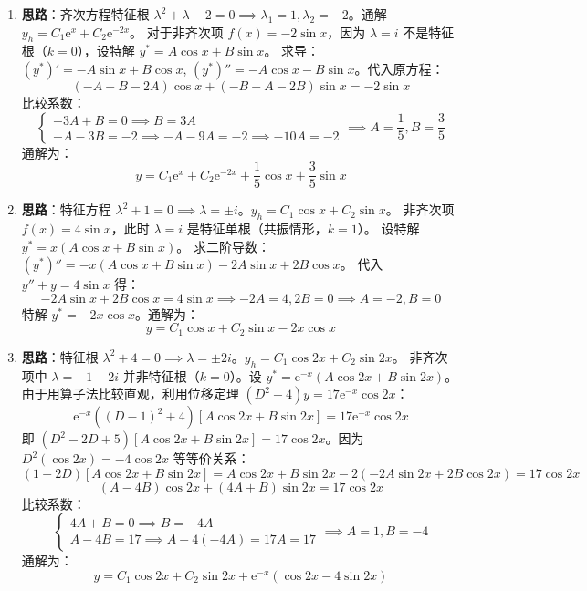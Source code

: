\documentclass[lang=cn,11pt]{elegantbook}
\begin{document}
\begin{solution}
\begin{enumerate}
    \item[(1)] \textbf{思路}：齐次方程特征根 $\lambda^2+\lambda-2=0 \implies \lambda_1=1, \lambda_2=-2$。通解 $y_h = C_1\mathrm{e}^x + C_2\mathrm{e}^{-2x}$。
    对于非齐次项 $f(x) = -2\sin x$，因为 $\lambda = i$ 不是特征根（$k=0$），设特解 $y^* = A\cos x + B\sin x$。
    求导：$(y^*)' = -A\sin x + B\cos x$, $(y^*)'' = -A\cos x - B\sin x$。代入原方程：
    \[
    (-A+B-2A)\cos x + (-B-A-2B)\sin x = -2\sin x
    \]
    比较系数：
    \[
    \begin{cases}
    -3A + B = 0 \implies B = 3A \\
    -A - 3B = -2 \implies -A - 9A = -2 \implies -10A = -2
    \end{cases}
    \implies A = \frac{1}{5}, B = \frac{3}{5}
    \]
    通解为：
    \[
    y = C_1\mathrm{e}^x + C_2\mathrm{e}^{-2x} + \frac{1}{5}\cos x + \frac{3}{5}\sin x
    \]

    \item[(2)] \textbf{思路}：特征方程 $\lambda^2+1=0 \implies \lambda = \pm i$。$y_h = C_1\cos x + C_2\sin x$。
    非齐次项 $f(x) = 4\sin x$，此时 $\lambda = i$ 是特征单根（共振情形，$k=1$）。
    设特解 $y^* = x(A\cos x + B\sin x)$。
    求二阶导数：$(y^*)'' = -x(A\cos x + B\sin x) - 2A\sin x + 2B\cos x$。
    代入 $y''+y=4\sin x$ 得：
    \[
    -2A\sin x + 2B\cos x = 4\sin x \implies -2A = 4, 2B = 0 \implies A = -2, B = 0
    \]
    特解 $y^* = -2x\cos x$。通解为：
    \[
    y = C_1\cos x + C_2\sin x - 2x\cos x
    \]

    \item[(3)] \textbf{思路}：特征根 $\lambda^2+4=0 \implies \lambda=\pm 2i$。$y_h = C_1\cos 2x + C_2\sin 2x$。
    非齐次项中 $\lambda = -1 + 2i$ 并非特征根（$k=0$）。设 $y^* = \mathrm{e}^{-x}(A\cos 2x + B\sin 2x)$。
    由于用算子法比较直观，利用位移定理 $(D^2+4)y = 17\mathrm{e}^{-x}\cos 2x$：
    \[
    \mathrm{e}^{-x} ((D-1)^2+4)[A\cos 2x + B\sin 2x] = 17\mathrm{e}^{-x}\cos 2x
    \]
    即 $(D^2-2D+5)[A\cos 2x + B\sin 2x] = 17\cos 2x$。因为 $D^2(\cos 2x) = -4\cos 2x$ 等等价关系：
    \[
    (1-2D)[A\cos 2x + B\sin 2x] = A\cos 2x + B\sin 2x - 2(-2A\sin 2x + 2B\cos 2x) = 17\cos 2x
    \]
    \[
    (A-4B)\cos 2x + (4A+B)\sin 2x = 17\cos 2x
    \]
    比较系数：
    \[
    \begin{cases}
    4A + B = 0 \implies B = -4A \\
    A - 4B = 17 \implies A - 4(-4A) = 17A = 17
    \end{cases}
    \implies A = 1, B = -4
    \]
    通解为：
    \[
    y = C_1\cos 2x + C_2\sin 2x + \mathrm{e}^{-x}(\cos 2x - 4\sin 2x)
    \]


\end{enumerate}
\end{solution}
\end{document}

